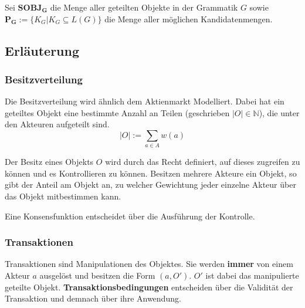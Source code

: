 \documentclass[]{article}
\begin{document}
Sei $\mathbf{SOBJ_G}$ die Menge aller geteilten Objekte in der Grammatik $G$ sowie 
 $\mathbf{P_G}:= \{ K_G | K_G \subseteq L(G) \}$ die Menge aller möglichen Kandidatenmengen.

\subsection {Erläuterung}


\subsubsection*{Besitzverteilung}


Die Besitzverteilung wird ähnlich dem Aktienmarkt Modelliert. Dabei hat ein geteiltes Objekt eine bestimmte Anzahl an Teilen (geschrieben $|O| \in \mathbb{N}$), die unter den Akteuren aufgeteilt sind. 
\[ |O| := \sum_{a \in A} w(a) \] 

Der Besitz eines Objekts $O$ wird durch das Recht definiert, auf dieses zugreifen zu können und es Kontrollieren zu können\cite{Waldron2004}. Besitzen mehrere Akteure ein Objekt, so gibt der Anteil am Objekt an, zu welcher Gewichtung jeder einzelne Akteur über das Objekt mitbestimmen kann.

Eine Konsensfunktion entscheidet über die Ausführung der Kontrolle.





% 



\subsubsection*{Transaktionen}

Transaktionen sind Manipulationen des Objektes. Sie werden \textbf{immer} von einem Akteur $a$ ausgelöst und besitzen die Form $(a, O')$. $O'$ ist dabei das manipulierte geteilte Objekt. \textbf{Transaktionsbedingungen} entscheiden über die Validität der Transaktion und demnach über ihre Anwendung.
\end{document}
